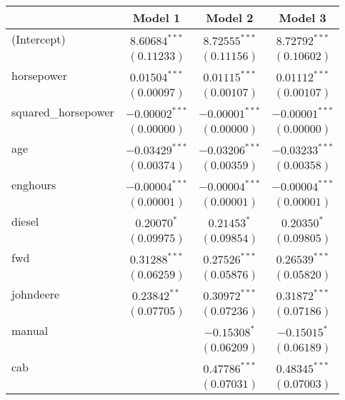 
\begin{table}
\begin{center}
\begin{tabular}{l c c c}
\hline
 & Model 1 & Model 2 & Model 3 \\
\hline
(Intercept)         & $8.60684^{***}$  & $8.72555^{***}$  & $8.72792^{***}$  \\
                    & $(0.11233)$      & $(0.11156)$      & $(0.10602)$      \\
horsepower          & $0.01504^{***}$  & $0.01115^{***}$  & $0.01112^{***}$  \\
                    & $(0.00097)$      & $(0.00107)$      & $(0.00107)$      \\
squared\_horsepower & $-0.00002^{***}$ & $-0.00001^{***}$ & $-0.00001^{***}$ \\
                    & $(0.00000)$      & $(0.00000)$      & $(0.00000)$      \\
age                 & $-0.03429^{***}$ & $-0.03206^{***}$ & $-0.03233^{***}$ \\
                    & $(0.00374)$      & $(0.00359)$      & $(0.00358)$      \\
enghours            & $-0.00004^{***}$ & $-0.00004^{***}$ & $-0.00004^{***}$ \\
                    & $(0.00001)$      & $(0.00001)$      & $(0.00001)$      \\
diesel              & $0.20070^{*}$    & $0.21453^{*}$    & $0.20350^{*}$    \\
                    & $(0.09975)$      & $(0.09854)$      & $(0.09805)$      \\
fwd                 & $0.31288^{***}$  & $0.27526^{***}$  & $0.26539^{***}$  \\
                    & $(0.06259)$      & $(0.05876)$      & $(0.05820)$      \\
johndeere           & $0.23842^{**}$   & $0.30972^{***}$  & $0.31872^{***}$  \\
                    & $(0.07705)$      & $(0.07236)$      & $(0.07186)$      \\
manual              &                  & $-0.15308^{*}$   & $-0.15015^{*}$   \\
                    &                  & $(0.06209)$      & $(0.06189)$      \\
cab                 &                  & $0.47786^{***}$  & $0.48345^{***}$  \\
                    &                  & $(0.07031)$      & $(0.07003)$      \\

\end{tabular}
\end{center}
\end{table}
